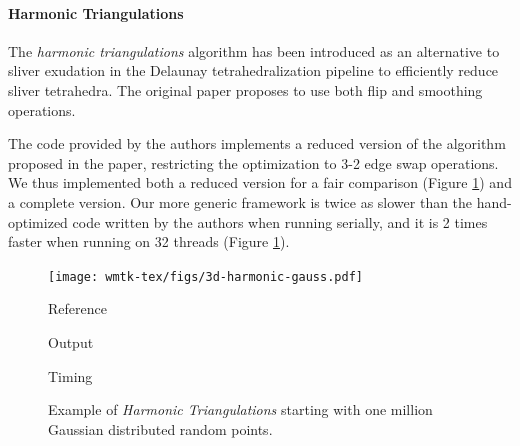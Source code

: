 \paragraph{Harmonic Triangulations}

The \emph{harmonic triangulations} algorithm has been introduced as an alternative to sliver exudation in the Delaunay tetrahedralization pipeline to efficiently reduce sliver tetrahedra. The original paper \cite{Alexa:2019} proposes to use both flip and smoothing operations. 

The code provided by the authors implements a reduced version of the algorithm proposed in the paper, restricting the optimization to 3-2 edge swap operations. We thus implemented both a reduced version for a fair comparison (Figure \ref{fig:harmonic}) and a complete version. Our more generic framework is twice as slower than the hand-optimized code written by the authors when running serially, and it is 2 times faster when running on 32 threads (Figure \ref{fig:harmonic}).

\begin{figure}
    \centering\footnotesize
    \texttt{[image: wmtk-tex/figs/3d-harmonic-gauss.pdf]}
    \parbox{.2\linewidth}{\centering Reference}\hfill
    \parbox{.2\linewidth}{\centering Output}\hfill
    \parbox{.3\linewidth}{\centering Timing}\par
    \caption{Example of \emph{Harmonic Triangulations} starting with one million Gaussian distributed random points. }
    \label{fig:harmonic}
    
    
    
\end{figure}

